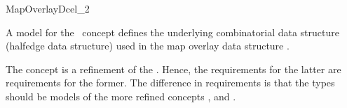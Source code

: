
\ccRefPageBegin


\begin{ccRefConcept}{MapOverlayDcel_2}

   A model for the \ccRefName\ concept defines the underlying
   combinatorial data structure (halfedge data structure) used in the
   map overlay data structure .


The
\lcTex{\ccc{\ccRefName}}\lcHtml{\ccRefName}
concept is a refinement of the . 
Hence, the requirements for the latter are requirements for the former. 
The difference in requirements is that the  
types should be models of the more refined concepts 
,  and .

\ccTypes

    

\end{ccRefConcept} %
\ccRefPageEnd
